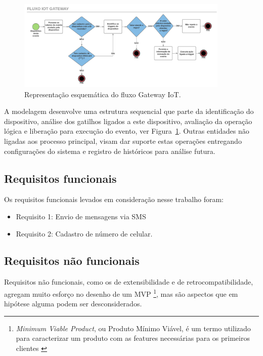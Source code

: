 \begin{figure}[h!]
		\begin{center}
		\includegraphics[width=0.9\textwidth]{./img/fluxograma}
		\caption{Representação esquemática do fluxo Gateway IoT.}
		\label{fig:fluxograma}
	\end{center}
\end{figure}

A modelagem desenvolve uma estrutura sequencial que parte da identificação do dispositivo, análise dos gatilhos ligados a este dispositivo, avaliação da operação lógica e liberação para execução do evento, ver Figura~\ref{fig:fluxograma}. Outras entidades não ligadas aos processo principal, visam dar suporte estas operações entregando configurações do sistema e registro de históricos para análise futura. 

\subsection{Requisitos funcionais}
\label{reqFuncionais}

Os requisitos funcionais levados em consideração nesse trabalho foram:

\begin{itemize}
	\item Requisito 1: Envio de mensagens via SMS \cite{SMS}
	
	\item Requisito 2: Cadastro de número de celular.
\end{itemize}

\subsection{Requisitos não funcionais}
\label{reqNaoFuncionais}

Requisitos não funcionais, como os de extensibilidade e de retrocompatibilidade, agregam muito esforço no desenho de um MVP \footnote{\textit{Minimum Viable Product}, ou Produto Mínimo Viável, é um termo utilizado para caracterizar um produto com as features necessárias para os primeiros clientes \cite{MVP}}, mas são aspectos que em hipótese alguma podem ser desconsiderados.